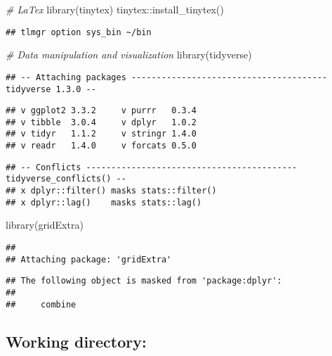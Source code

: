 \documentclass[
]{article}
\newenvironment{Shaded}{\begin{snugshade}}{\end{snugshade}}
\newcommand{\CommentTok}[1]{\textcolor[rgb]{0.56,0.35,0.01}{\textit{#1}}}
\newcommand{\FunctionTok}[1]{\textcolor[rgb]{0.00,0.00,0.00}{#1}}
\newcommand{\NormalTok}[1]{#1}
\newcommand{\SpecialCharTok}[1]{\textcolor[rgb]{0.00,0.00,0.00}{#1}}
\begin{document}
\begin{Shaded}
\begin{Highlighting}[]
\CommentTok{\# LaTex}
\FunctionTok{library}\NormalTok{(tinytex)}
\NormalTok{tinytex}\SpecialCharTok{::}\FunctionTok{install\_tinytex}\NormalTok{()}
\end{Highlighting}
\end{Shaded}

\begin{verbatim}
## tlmgr option sys_bin ~/bin
\end{verbatim}

\begin{Shaded}
\begin{Highlighting}[]
\CommentTok{\# Data manipulation and visualization}
\FunctionTok{library}\NormalTok{(tidyverse)}
\end{Highlighting}
\end{Shaded}

\begin{verbatim}
## -- Attaching packages --------------------------------------- tidyverse 1.3.0 --
\end{verbatim}

\begin{verbatim}
## v ggplot2 3.3.2     v purrr   0.3.4
## v tibble  3.0.4     v dplyr   1.0.2
## v tidyr   1.1.2     v stringr 1.4.0
## v readr   1.4.0     v forcats 0.5.0
\end{verbatim}

\begin{verbatim}
## -- Conflicts ------------------------------------------ tidyverse_conflicts() --
## x dplyr::filter() masks stats::filter()
## x dplyr::lag()    masks stats::lag()
\end{verbatim}

\begin{Shaded}
\begin{Highlighting}[]
\FunctionTok{library}\NormalTok{(gridExtra)}
\end{Highlighting}
\end{Shaded}

\begin{verbatim}
## 
## Attaching package: 'gridExtra'
\end{verbatim}

\begin{verbatim}
## The following object is masked from 'package:dplyr':
## 
##     combine
\end{verbatim}

\hypertarget{working-directory}{%
\subsection{Working directory:}\label{working-directory}}
\end{document}
